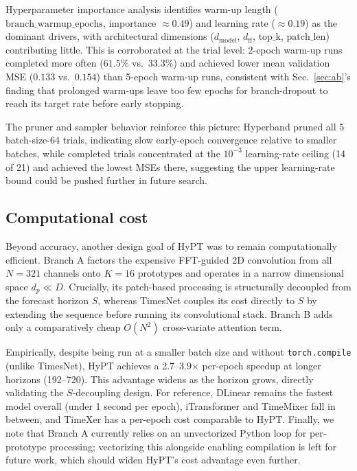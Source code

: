 \documentclass[10pt,journal]{IEEEtran}
\newcommand{\secref}[1]{Sec.~\ref{#1}}
\begin{document}
Hyperparameter importance analysis identifies warm-up length ($\mathrm{branch\_warmup\_epochs}$, importance $\approx 0.49$) and learning rate ($\approx 0.19$) as the dominant drivers, with architectural dimensions ($d_{\mathrm{model}}$, $d_{\mathrm{ff}}$, $\mathrm{top\_k}$, $\mathrm{patch\_len}$) contributing little. This is corroborated at the trial level: 2-epoch warm-up runs completed more often ($61.5\%$ vs.\ $33.3\%$) and achieved lower mean validation MSE ($0.133$ vs.\ $0.154$) than 5-epoch warm-up runs, consistent with \secref{sec:ab}'s finding that prolonged warm-ups leave too few epochs for branch-dropout to reach its target rate before early stopping.

The pruner and sampler behavior reinforce this picture: Hyperband pruned all 5 batch-size-64 trials, indicating slow early-epoch convergence relative to smaller batches, while completed trials concentrated at the $10^{-3}$ learning-rate ceiling (14 of 21) and achieved the lowest MSEs there, suggesting the upper learning-rate bound could be pushed further in future search.

\subsection{Computational cost}
\label{sec:cost}
Beyond accuracy, another design goal of HyPT was to remain computationally efficient. Branch A factors the expensive FFT-guided 2D convolution from all $N = 321$ channels onto $K = 16$ prototypes and operates in a narrow dimensional space $d_p \ll D$. Crucially, its patch-based processing is structurally decoupled from the forecast horizon $S$, whereas TimesNet couples its cost directly to $S$ by extending the sequence before running its convolutional stack. Branch B adds only a comparatively cheap $O(N^2)$ cross-variate attention term.

Empirically, despite being run at a smaller batch size and without \texttt{torch.compile} (unlike TimesNet), HyPT achieves a 2.7--3.9$\times$ per-epoch speedup at longer horizons (192--720). This advantage widens as the horizon grows, directly validating the $S$-decoupling design. For reference, DLinear remains the fastest model overall (under 1 second per epoch), iTransformer and TimeMixer fall in between, and TimeXer has a per-epoch cost comparable to HyPT. Finally, we note that Branch A currently relies on an unvectorized Python loop for per-prototype processing; vectorizing this alongside enabling compilation is left for future work, which should widen HyPT's cost advantage even further.
\end{document}
